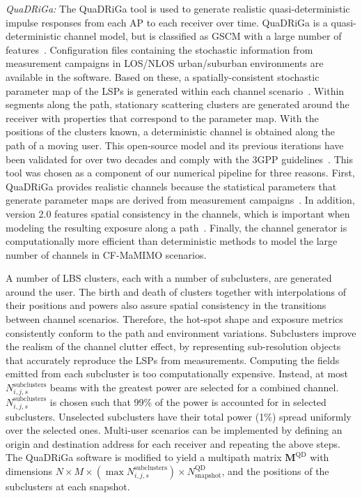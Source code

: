 \documentclass{IEEEtran}
\begin{document}
\textit{QuaDRiGa:} The \gls{QuaDRiGa} tool is used to generate realistic quasi-deterministic impulse responses from each \gls{AP} to each receiver over time. \gls{QuaDRiGa} is a quasi-deterministic channel model, but is classified as \gls{GSCM} with a large number of features~\cite{channelgensurver}. 
Configuration files containing the stochastic information from measurement campaigns in \gls{LOS}/\gls{NLOS} urban/suburban environments are available in the software. Based on these, a spatially-consistent stochastic parameter map of the \glspl{LSP} is generated within each channel scenario~\cite{Quadriga}. Within segments along the path, stationary scattering clusters are generated around the receiver with properties that correspond to the parameter map. With the positions of the clusters known, a deterministic channel is obtained along the path of a moving user. This open-source model and its previous iterations have been validated for over two decades and comply with the 3GPP guidelines~\cite{QDcomplies3GPP}. This tool was chosen as a component of our numerical pipeline for three reasons. First, \gls{QuaDRiGa} provides realistic channels because the statistical parameters that generate parameter maps are derived from measurement campaigns~\cite{QDmeasurements, Quadriga}. In addition, version 2.0 features spatial consistency in the channels, which is important when modeling the resulting exposure along a path~\cite{spatialconsistency, QDv2}. Finally, the channel generator is computationally more efficient than deterministic methods to model the large number of channels in \gls{CF-MaMIMO} scenarios.

A number of \gls{LBS} clusters, each with a number of subclusters, are generated around the user. The birth and death of clusters together with interpolations of their positions and powers also assure spatial consistency in the transitions between channel scenarios. Therefore, the hot-spot shape and exposure metrics consistently conform to the path and environment variations. Subclusters improve the realism of the channel clutter effect, by representing sub-resolution objects that accurately reproduce the \glspl{LSP} from measurements. Computing the fields emitted from each subcluster is too computationally expensive. Instead, at most $N^\mathrm{subclusters}_{i,j,s}$ beams with the greatest power are selected for a combined channel. $N^\mathrm{subclusters}_{i,j,s}$ is chosen such that 99\% of the power is accounted for in selected subclusters. Unselected subclusters have their total power (1\%) spread uniformly over the selected ones. Multi-user scenarios can be implemented by defining an origin and destination address for each receiver and repeating the above steps. The \gls{QuaDRiGa} software is modified to yield a multipath matrix $\textbf{M}^\mathrm{QD}$ with dimensions $N \times M \times \left( \max N_{i,j,s}^\mathrm{subclusters} \right) \times N_\mathrm{snapshot}^\mathrm{QD}$, and the positions of the subclusters at each snapshot. 
\end{document}
